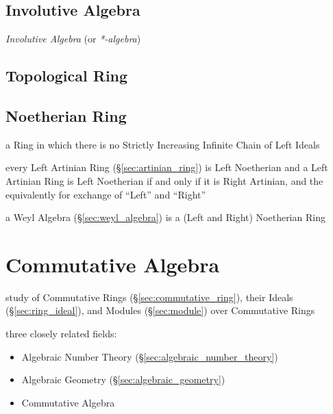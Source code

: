 \begin{itemize}
\subsection{Involutive Algebra}\label{sec:involutive_algebra}

\emph{Involutive Algebra} (or \emph{*-algebra})



\subsection{Topological Ring}\label{sec:topological_ring}

\subsection{Noetherian Ring}\label{sec:noetherian_ring}

a Ring in which there is no Strictly Increasing Infinite Chain of Left Ideals

every Left Artinian Ring (\S\ref{sec:artinian_ring}) is Left Noetherian and a
Left Artinian Ring is Left Noetherian if and only if it is Right Artinian, and
the equivalently for exchange of ``Left'' and ``Right''

\fist a Weyl Algebra (\S\ref{sec:weyl_algebra}) is a (Left and Right)
Noetherian Ring



\section{Commutative Algebra}\label{sec:commutative_algebra}

study of Commutative Rings (\S\ref{sec:commutative_ring}), their Ideals
(\S\ref{sec:ring_ideal}), and Modules (\S\ref{sec:module}) over Commutative
Rings

three closely related fields:
\begin{itemize}
  \item Algebraic Number Theory (\S\ref{sec:algebraic_number_theory})
  \item Algebraic Geometry (\S\ref{sec:algebraic_geometry})
  \item Commutative Algebra
\end{itemize}


\end{itemize}
